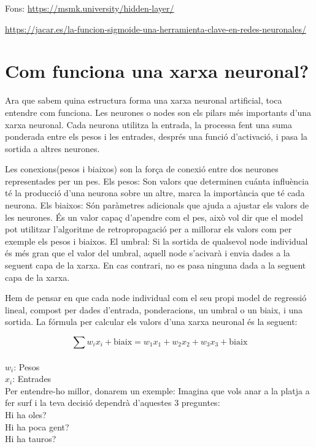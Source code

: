 {Fons: \href{https://msmk.university/hidden-layer/}{https://msmk.university/hidden-layer/}


\href{https://jacar.es/la-funcion-sigmoide-una-herramienta-clave-en-redes-neuronales/}{https://jacar.es/la-funcion-sigmoide-una-herramienta-clave-en-redes-neuronales/}

\section{Com funciona una xarxa neuronal?}\label{sec:3.8}
Ara que sabem quina estructura forma una xarxa neuronal artificial, toca entendre com funciona. Les neurones o nodes son els pilars més importants d'una xarxa neuronal. Cada neurona utilitza la entrada, la processa fent una suma ponderada entre els pesos i les entrades, després una funció d'activació, i pasa la sortida a altres neurones.

Les conexions(pesos i biaixos) son la força de conexió entre dos neurones representades per un pes.
Els pesos: Son valors que determinen cuánta influència té la producció d'una neurona sobre un altre, marca la importància que té cada neurona.
Els biaixos: Són paràmetres adicionals que ajuda a ajustar els valors de les neurones. És un valor capaç d'apendre com el pes, això vol dir que el model pot utilitzar l'algoritme de retropropagació per a millorar els valors com per exemple els pesos i biaixos.
El umbral: Si la sortida de qualsevol node individual és més gran que el valor del umbral, aquell node s'acivarà i envia dades a la seguent capa de la xarxa. En cas contrari, no es pasa ninguna dada a la seguent capa de la xarxa.

Hem de pensar en que cada node individual com el seu propi model de regressió lineal, compost per dades d'entrada, ponderacions, un umbral o un biaix, i una sortida. La fórmula per calcular els valors d'una xarxa neuronal és la seguent:

\[
\sum w_i x_i + \text{biaix} = w_1 x_1 + w_2 x_2 + w_3 x_3 + \text{biaix}
\] \\

$w_i$: Pesos\\
$x_i$: Entrades\\


Per entendre-ho millor, donarem un exemple: Imagina que vols anar a la platja a fer surf i la teva decisió dependrà d'aquestes 3 preguntes:\\

Hi ha oles?\\
Hi ha poca gent?\\
Hi ha tauros?\\

}
